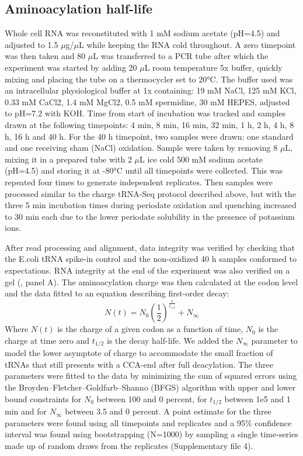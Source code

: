 \documentclass[9pt,lineno]{elife}
\begin{document}
\subsection{Aminoacylation half-life}
Whole cell RNA was reconstituted with 1 mM sodium acetate (pH=4.5) and adjusted to 1.5 $\mu$g/$\mu$L while keeping the RNA cold throughout.
A zero timepoint was then taken and 80 $\mu$L was transferred to a PCR tube after which the experiment was started by adding 20 $\mu$L room temperature 5x buffer, quickly mixing and placing the tube on a thermocycler set to 20°C.
The buffer used was an intracellular physiological buffer at 1x containing: 19 mM NaCl, 125 mM KCl, 0.33 mM CaCl2, 1.4 mM MgCl2, 0.5 mM spermidine, 30 mM HEPES, adjusted to pH=7.2 with KOH.
Time from start of incubation was tracked and samples drawn at the following timepoints: 4 min, 8 min, 16 min, 32 min, 1 h, 2 h, 4 h, 8 h, 16 h and 40 h.
For the 40 h timepoint, two samples were drawn: one standard and one receiving sham (NaCl) oxidation.
Sample were taken by removing 8 $\mu$L, mixing it in a prepared tube with 2 $\mu$L ice cold 500 mM sodium acetate (pH=4.5) and storing it at -80°C until all timepoints were collected.
This was repeated four times to generate independent replicates.
Then samples were processed similar to the charge tRNA-Seq protocol described above, but with the three 5 min incubation times during periodate oxidation and quenching increased to 30 min each due to the lower periodate solubility in the presence of potassium ions.

After read processing and alignment, data integrity was verified by checking that the E.coli tRNA spike-in control and the non-oxidized 40 h samples conformed to expectations.
RNA integrity at the end of the experiment was also verified on a gel (, panel A).
The aminoacylation charge was then calculated at the codon level and the data fitted to an equation describing first-order decay:
\begin{equation}
N(t) = N_0 \left( \frac{1}{2} \right) ^\frac{t}{t_{1/2}} + N_{\infty}
\end{equation}
Where $N(t)$ is the charge of a given codon as a function of time, $N_0$ is the charge at time zero and $t_{1/2}$ is the decay half-life.
We added the $N_{\infty}$ parameter to model the lower asymptote of charge to accommodate the small fraction of tRNAs that still presents with a CCA-end after full deacylation.
The three parameters were fitted to the data by minimizing the sum of squared errors using the Broyden–Fletcher–Goldfarb–Shanno (BFGS) algorithm with upper and lower bound constraints for $N_0$ between 100 and 0 percent, for $t_{1/2}$ between 1e5 and 1 min and for $N_{\infty}$ between 3.5 and 0 percent.
A point estimate for the three parameters were found using all timepoints and replicates and a 95\% confidence interval was found using bootstrapping (N=1000) by sampling a single time-series made up of random draws from the replicates (Supplementary file 4).
\end{document}
